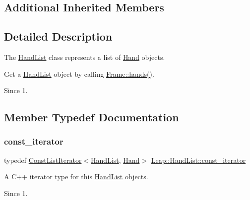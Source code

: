 \subsection*{Additional Inherited Members}


\subsection{Detailed Description}
The \hyperlink{class_leap_1_1_hand_list}{Hand\+List} class represents a list of \hyperlink{class_leap_1_1_hand}{Hand} objects.

Get a \hyperlink{class_leap_1_1_hand_list}{Hand\+List} object by calling \hyperlink{class_leap_1_1_frame_ad1c4ed839718ce803f8fb884046ff2ca}{Frame\+::hands()}.


\begin{DoxyCodeInclude}
\end{DoxyCodeInclude}


\begin{DoxySince}{Since}
1. 
\end{DoxySince}


\subsection{Member Typedef Documentation}
\mbox{\label{class_leap_1_1_hand_list_a9c35a4db8fd94a3b1a029efecbd13668}} 
\subsubsection{\texorpdfstring{const\+\_\+iterator}{const\_iterator}}
{\footnotesize\ttfamily typedef \hyperlink{class_leap_1_1_const_list_iterator}{Const\+List\+Iterator}$<$\hyperlink{class_leap_1_1_hand_list}{Hand\+List}, \hyperlink{class_leap_1_1_hand}{Hand}$>$ \hyperlink{class_leap_1_1_hand_list_a9c35a4db8fd94a3b1a029efecbd13668}{Leap\+::\+Hand\+List\+::const\+\_\+iterator}}

A C++ iterator type for this \hyperlink{class_leap_1_1_hand_list}{Hand\+List} objects.


\begin{DoxyCodeInclude}
\end{DoxyCodeInclude}


\begin{DoxySince}{Since}
1. 
\end{DoxySince}



